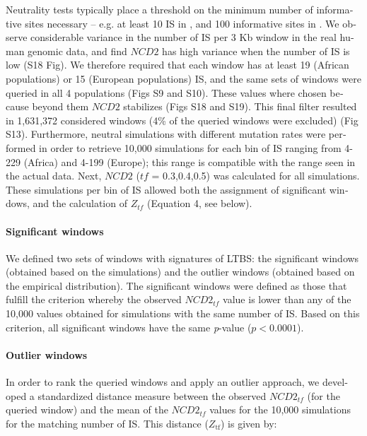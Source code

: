 \begin{refsection}
\begin{otherlanguage}{english}
Neutrality tests typically place a threshold on the minimum number of informative sites necessary -- e.g. at least 10 IS in \textcite{Andres2009}, and 100 informative sites in \textcite{DeGiorgio2014}. We observe considerable variance in the number of IS per 3 Kb window in the real human genomic data, and find $NCD2$ has high variance when the number of IS is low (S18 Fig). We therefore required that each window has at least 19 (African populations) or 15 (European populations) IS, and the same sets of windows were queried in all 4 populations (Figs S9 and S10). These values where chosen because beyond them $NCD2$ stabilizes (Figs S18 and S19). This final filter resulted in 1,631,372 considered windows  (4\% of the queried windows were excluded) (Fig S13). Furthermore, neutral simulations with different mutation rates were performed in order to retrieve 10,000 simulations for each bin of IS ranging from 4-229 (Africa) and 4-199 (Europe); this range is compatible with the range seen in the actual data. Next, $NCD2$ ($tf$ = 0.3,0.4,0.5) was calculated for all simulations. These simulations per bin of IS allowed both the assignment of significant windows, and the calculation of $Z_{tf}$ (Equation 4, see below).

\paragraph{Significant windows}
We defined two sets of windows with signatures of LTBS: the significant windows (obtained based on the simulations) and the outlier windows (obtained based on the
empirical distribution). The significant windows were defined as those that fulfill the criterion whereby the observed $NCD2_{tf}$ value is lower than any of the 10,000 values obtained for simulations with the same number of IS. Based on this criterion, all significant windows have the same \emph{p}-value ($p<0.0001$).

\paragraph{Outlier windows}
In order to rank the queried windows and apply an outlier approach, we developed a standardized distance measure between the observed $NCD2_{tf}$ (for the queried window) and the mean of the $NCD2_{tf}$ values for the 10,000 simulations for the matching number of IS. This distance ($Z_{\mathrm{tf}}$) is given by: 


\end{otherlanguage}
\end{refsection}
